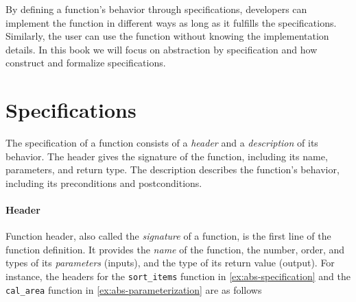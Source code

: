 \documentclass[oneside,11pt,dvipsnames]{book}
\newcommand{\code}[1]{\texttt{#1}}
\begin{document}
By defining a function's behavior through specifications, developers can implement the function in different ways as long as it fulfills the specifications. Similarly, the user can use the function without knowing the implementation details. In this book we will focus on abstraction by specification and how construct and formalize specifications.

\section{Specifications}\label{sec:specifications}







The specification of a function consists of a \emph{header} and a \emph{description} of its behavior.
The header gives the signature of the function, including its name, parameters, and return type. The description describes the function's behavior, including its preconditions and postconditions.

\paragraph{Header} Function header, also called the \emph{signature} of a function, is the first line of the function definition. It provides the \emph{name} of the function, the number, order, and types of its \emph{parameters} (inputs), and the type of its return value (output). For instance, the headers for the \code{sort\_items} function in \autoref{ex:abs-specification} and the \code{cal\_area} function in \autoref{ex:abs-parameterization} are as follows
\end{document}
